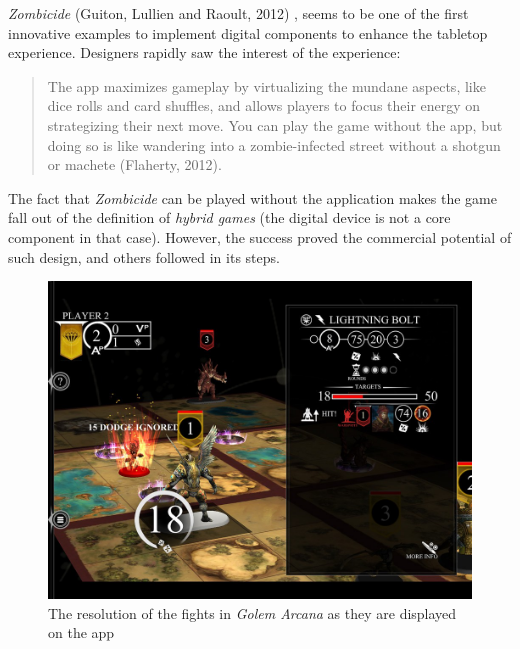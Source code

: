 \textit{Zombicide} (Guiton, Lullien and Raoult, 2012) \cite{game:zombi}, seems to be one of the first innovative examples to implement digital components to enhance the tabletop experience. Designers rapidly saw the interest of the experience:

\begin{quotation}
The app maximizes gameplay by virtualizing the mundane aspects, like dice rolls and card shuffles, and allows players to focus their energy on strategizing their next move. You can play the game without the app, but doing so is like wandering into a zombie-infected street without a shotgun or machete (Flaherty, 2012)\cite{web:wired}.
\end{quotation}

The fact that \textit{Zombicide} can be played without the application makes the game fall out of the definition of \textit{hybrid games} (the digital device is not a core component in that case). However, the success proved the commercial potential of such design, and others followed in its steps.

\begin{figure}[!ht]
    \centering
    \includegraphics[scale=0.2]{Images/golem_app.jpg}
    \caption{The resolution of the fights in \textit{Golem Arcana} as they are displayed on the app}
    \label{fig:Golem}
\end{figure}

